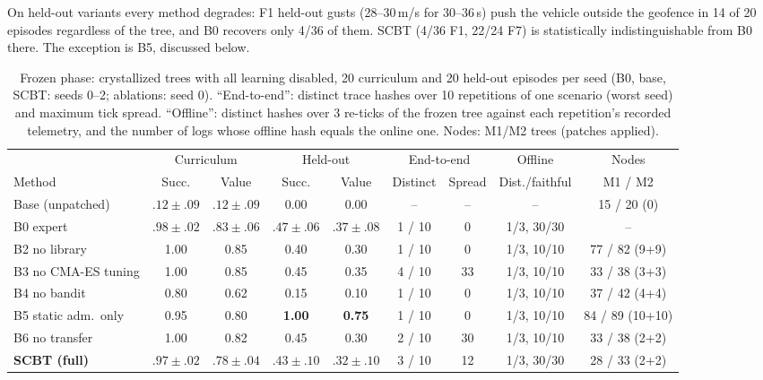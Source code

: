 \documentclass[conference]{IEEEtran}
\begin{document}
On held-out variants every method degrades: F1 held-out gusts (28--30\,m/s for 30--36\,s) push the vehicle outside the geofence in 14 of 20 episodes regardless of the tree, and B0 recovers only 4/36 of them. SCBT (4/36 F1, 22/24 F7) is statistically indistinguishable from B0 there. The exception is B5, discussed below.

\begin{table}[t]
\caption{Frozen phase: crystallized trees with all learning disabled, 20 curriculum and 20 held-out episodes per seed (B0, base, SCBT: seeds 0--2; ablations: seed 0). ``End-to-end'': distinct trace hashes over 10 repetitions of one scenario (worst seed) and maximum tick spread. ``Offline'': distinct hashes over 3 re-ticks of the frozen tree against each repetition's recorded telemetry, and the number of logs whose offline hash equals the online one. Nodes: M1/M2 trees (patches applied).}
\centering\footnotesize
\begin{tabular}{lcccccccc}
\toprule
 & \multicolumn{2}{c}{Curriculum} & \multicolumn{2}{c}{Held-out} & \multicolumn{2}{c}{End-to-end} & Offline & Nodes \\
\cmidrule(lr){2-3}\cmidrule(lr){4-5}\cmidrule(lr){6-7}
Method & Succ. & Value & Succ. & Value & Distinct & Spread & Dist./faithful & M1 / M2 \\
\midrule
Base (unpatched)  & $.12\pm.09$ & $.12\pm.09$ & 0.00 & 0.00 & -- & -- & -- & 15 / 20 (0) \\
B0 expert & $.98\pm.02$ & $.83\pm.06$ & $.47\pm.06$ & $.37\pm.08$ & 1 / 10 & 0 & 1/3, 30/30 & -- \\
B2 no library          & 1.00 & 0.85 & 0.40 & 0.30 & 1 / 10 & 0  & 1/3, 10/10 & 77 / 82 (9+9) \\
B3 no CMA-ES tuning    & 1.00 & 0.85 & 0.45 & 0.35 & 4 / 10 & 33 & 1/3, 10/10 & 33 / 38 (3+3) \\
B4 no bandit           & 0.80 & 0.62 & 0.15 & 0.10 & 1 / 10 & 0  & 1/3, 10/10 & 37 / 42 (4+4) \\
B5 static adm.\ only & 0.95 & 0.80 & \textbf{1.00} & \textbf{0.75} & 1 / 10 & 0 & 1/3, 10/10 & 84 / 89 (10+10) \\
B6 no transfer & 1.00 & 0.82 & 0.45 & 0.30 & 2 / 10 & 30 & 1/3, 10/10 & 33 / 38 (2+2) \\
\textbf{SCBT (full)} & $\mathbf{.97\pm.02}$ & $.78\pm.04$ & $.43\pm.10$ & $.32\pm.10$ & 3 / 10 & 12 & 1/3, 30/30 & 28 / 33 (2+2) \\
\bottomrule
\end{tabular}
\label{tab:frozen}
\end{table}
\end{document}
